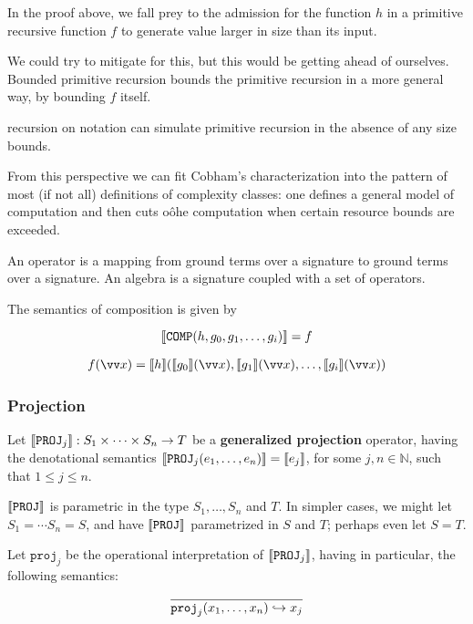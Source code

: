 In the proof above, we fall prey to the admission for the function $h$ in a
primitive recursive function $f$ to generate value larger in size than its
input.

We could try to mitigate for this, but this would be getting ahead of
ourselves. Bounded primitive recursion bounds the primitive recursion in a more
general way, by bounding $f$ itself.

recursion on notation can simulate primitive recursion in the absence of any
size bounds\cite{bellantoni-phd-1992}.

From this perspective we can fit Cobham's characterization into the pattern of
most (if not all) definitions of complexity classes: one defines a general
model of computation and then cuts oôhe computation when certain resource
bounds are exceeded.

An operator is a mapping from ground terms over a signature to ground terms
over a signature. An algebra is a signature coupled with a set of operators.

The semantics of composition is given by

$${\mathopen{}\left\llbracket{\mathtt{COMP}{\ensuremath{\mathopen{}\left({h,g_0,g_1,\ldots,g_i}\right)\mathclose{}}}}\right\rrbracket\mathclose{}} = f$$

\begin{align*}
%
f\p{\vect{x}} = \sem{h}\p{\sem{g_0}\p{\vect{x}}, \sem{g_1}\p{\vect{x}}, \ldots,
\sem{g_i}\p{\vect{x}}}
%
\end{align*}

\subsubsection{Projection}

\label{sec:generalised-projection}

\begin{definition} Let ${\mathopen{}\left\llbracket{\mathtt{PROJ}_j}\right\rrbracket\mathclose{}} : S_1 \times \cdots \times S_n
\rightarrow T$ be a \textbf{generalized projection} operator, having the
denotational semantics ${\mathopen{}\left\llbracket{\mathtt{PROJ}_j{\ensuremath{\mathopen{}\left({e_1,\ldots,e_n}\right)\mathclose{}}}}\right\rrbracket\mathclose{}} = {\mathopen{}\left\llbracket{e_j}\right\rrbracket\mathclose{}}$,
for some $j,n \in \mathbb{N}$, such that $1 \leq j \leq n$.  \end{definition}

\begin{remark} ${\mathopen{}\left\llbracket{\mathtt{PROJ}}\right\rrbracket\mathclose{}}$ is parametric in the type $S_1,\ldots,S_n$
and $T$. In simpler cases, we might let $S_1 = \cdots S_n = S$, and have
${\mathopen{}\left\llbracket{\mathtt{PROJ}}\right\rrbracket\mathclose{}}$ parametrized in $S$ and $T$; perhaps even let $S = T$.
\end{remark}

\begin{definition} Let $\mathtt{proj}_j$ be the operational interpretation of
${\mathopen{}\left\llbracket{\mathtt{PROJ}_j}\right\rrbracket\mathclose{}}$, having in particular, the following
semantics:\begin{align*}
%
\axiom{ \mathtt{proj}_j\p{x_1,\ldots,x_{n}} \goesto x_j }
%
\end{align*}

\end{definition}

